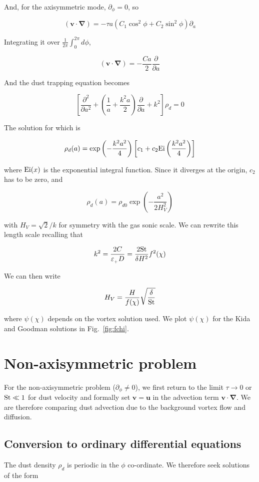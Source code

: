 \documentclass[apj]{emulateapj}
\newcommand{\pderiv}[2]{\frac{\partial #1}{\partial #2}}
\newcommand{\pderivn}[3]{\frac{\partial^{#3} #1}{\partial #2^{#3}}}
\renewcommand{\v}[1]{{\boldsymbol{#1}}} %
\newcommand{\del}{\v{\nabla}}
\newcommand{\Fig}[1]{Fig.~\ref{#1}}
\newcommand{\fig}[1]{\Fig{#1}}
\newcommand{\beq}{\begin{equation}}
\newcommand{\eeq}{\end{equation}}
\newcommand{\beqn}{\begin{eqnarray}}
\newcommand{\eeqn}{\end{eqnarray}}
\newcommand{\epsp}{\varepsilon_{_{+}}}
\begin{document}
And, for the axisymmetric mode, $\partial_\phi=0$, so

\beq
(\v{v}\cdot\del) = - \tau a \left( C_1 
  \cos^2\phi  + C_2  \sin^2\phi \right) \partial_a
\eeq

Integrating it over $\frac{1}{2\pi}\int_0^{2\pi} d\phi$, 

\beq
(\v{v}\cdot\del) = - \frac{C a}{2} \pderiv{}{a}
\eeq

And the dust trapping equation becomes 

\beq
\left[\pderivn{}{a}{2} + \left(\frac{1}{a} +
  \frac{k^2a}{2}\right)\pderiv{}{a} + k^2\right]\rho_d = 0 
\eeq

The solution for which is 

\beq
\rho_d(a) = \exp\left(-\frac{k^2a^2}{4}\right)  \left[c_1 + c_2 {\rm
    Ei}\left(\frac{k^2a^2}{4}\right)\right]
\eeq

\noindent where ${\rm Ei}(x)$ is the exponential integral function. 
Since it diverges at the origin, $c_2$ has to be zero, and 

\beq
\rho_d(a) = \rho_{d0} \exp\left(-\frac{a^2}{2H_V^2}\right)
\eeq

with $H_V = \sqrt{2}/k$ for symmetry with the gas sonic scale. We can 
rewrite this length scale recalling that 

\beqn
k^2 = \frac{2C}{\epsp D} = \frac{2{\rm St}}{\delta H^2} f^2(\chi)
\eeqn 

\noindent We can then write 

\beq
 H_V = \frac{H}{f(\chi)} \sqrt{\frac{\delta}{\rm St}}
\eeq

\noindent where $\psi(\chi)$ depends on the vortex solution used. We plot 
$\psi(\chi)$ for the Kida and Goodman solutions in \fig{fig:fchi}.


\section{Non-axisymmetric problem}
For the non-axisymmetric problem ($\partial_\phi\neq0$), we first
return to the limit $\tau\to0$ or $\rm{St}\ll 1$ for dust velocity and
formally set $\bm{v}=\bm{u}$ in the advection term 
$\bm{v}\cdot\del$. We are therefore comparing dust advection due to
the background vortex flow and diffusion. 

\subsection{Conversion to ordinary differential equations}
The dust density $\rho_d$ is periodic in the $\phi$ co-ordinate. We
therefore seek solutions of the form
\end{document}
